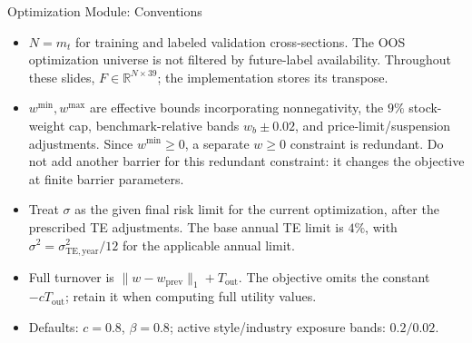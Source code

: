 \documentclass[aspectratio=169,xcolor=dvipsnames]{beamer}
\begin{document}
\begin{frame}{Optimization Module: Conventions}
    \small
    \begin{itemize}
        \item $N=m_t$ for training and labeled validation cross-sections.
        The OOS optimization universe is not filtered by future-label availability.
        Throughout these slides, $F\in\mathbb{R}^{N\times39}$;
        the implementation stores its transpose.

        \item $w^{\min},w^{\max}$ are effective bounds incorporating
        nonnegativity, the $9\%$ stock-weight cap, benchmark-relative
        bands $w_b\pm0.02$, and price-limit/suspension adjustments.
        Since $w^{\min}\geq0$, a separate $w\geq0$ constraint is redundant.
        Do not add another barrier for this redundant constraint:
        it changes the objective at finite barrier parameters.

        \item Treat $\sigma$ as the given final risk limit for the current
        optimization, after the prescribed TE adjustments.
        The base annual TE limit is $4\%$, with
        $\sigma^2=\sigma_{\mathrm{TE,year}}^2/12$ for the applicable annual limit.

        \item Full turnover is
        $\lVert w-w_{\mathrm{prev}}\rVert_1+T_{\mathrm{out}}$.
        The objective omits the constant $-cT_{\mathrm{out}}$;
        retain it when computing full utility values.

        \item Defaults: $c=0.8$, $\beta=0.8$;
        active style/industry exposure bands: $0.2/0.02$.
    \end{itemize}
\end{frame}
\end{document}

